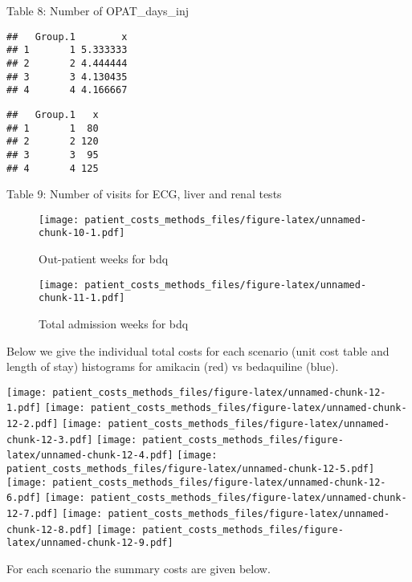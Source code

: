 \documentclass[]{article}
\begin{document}
Table 8: Number of OPAT\_days\_inj

\begin{verbatim}
##   Group.1        x
## 1       1 5.333333
## 2       2 4.444444
## 3       3 4.130435
## 4       4 4.166667
\end{verbatim}

\begin{verbatim}
##   Group.1   x
## 1       1  80
## 2       2 120
## 3       3  95
## 4       4 125
\end{verbatim}

Table 9: Number of visits for ECG, liver and renal tests

\begin{figure}
\centering
\texttt{[image: patient\_costs\_methods\_files/figure-latex/unnamed-chunk-10-1.pdf]}
\caption{Out-patient weeks for bdq}
\end{figure}

\begin{figure}
\centering
\texttt{[image: patient\_costs\_methods\_files/figure-latex/unnamed-chunk-11-1.pdf]}
\caption{Total admission weeks for bdq}
\end{figure}

Below we give the individual total costs for each scenario (unit cost
table and length of stay) histograms for amikacin (red) vs bedaquiline
(blue).

\texttt{[image: patient\_costs\_methods\_files/figure-latex/unnamed-chunk-12-1.pdf]}
\texttt{[image: patient\_costs\_methods\_files/figure-latex/unnamed-chunk-12-2.pdf]}
\texttt{[image: patient\_costs\_methods\_files/figure-latex/unnamed-chunk-12-3.pdf]}
\texttt{[image: patient\_costs\_methods\_files/figure-latex/unnamed-chunk-12-4.pdf]}
\texttt{[image: patient\_costs\_methods\_files/figure-latex/unnamed-chunk-12-5.pdf]}
\texttt{[image: patient\_costs\_methods\_files/figure-latex/unnamed-chunk-12-6.pdf]}
\texttt{[image: patient\_costs\_methods\_files/figure-latex/unnamed-chunk-12-7.pdf]}
\texttt{[image: patient\_costs\_methods\_files/figure-latex/unnamed-chunk-12-8.pdf]}
\texttt{[image: patient\_costs\_methods\_files/figure-latex/unnamed-chunk-12-9.pdf]}

For each scenario the summary costs are given below.
\end{document}
